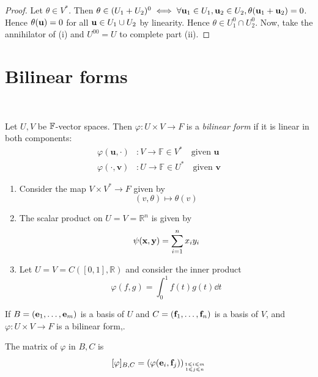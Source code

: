\documentclass[a4paper]{article}
\begin{document}
\begin{proof}
	Let \( \theta \in V^* \).
	Then \( \theta \in (U_1 + U_2)^0 \iff \forall {\bf u}_1 \in U_1, {\bf u}_2 \in U_2, \theta({\bf u}_1 + {\bf u}_2) = 0 \).
	Hence \( \theta({\bf u}) = 0 \) for all \( {\bf u} \in U_1 \cup U_2 \) by linearity.
	Hence \( \theta \in U_1^0 \cap U_2^0 \).
	Now, take the annihilator of (i) and \( U^{00} = U \) to complete part (ii).
\end{proof}

\section{Bilinear forms}\ \vspace{-1.5em}
\begin{definition}
	Let \( U, V \) be \( {\mathbb{F}} \)-vector spaces.
	Then \( \varphi \colon U \times V \to F \) is a \textit{bilinear form} if it is linear in both components:
    \begin{align*}
        \varphi(\mathbf{u},\cdot)&: V \to \mathbb{F} \in V^* \quad \text{given }\mathbf{u}\\
        \varphi(\cdot, \mathbf{v})&: U \to \mathbb{F} \in U^* \quad \text{given }\mathbf{v}
    \end{align*}
\end{definition}

\begin{example}
	\begin{enumerate}
        \item Consider the map \( V \times V^* \to F \) given by
        \[
            (v, \theta) \mapsto \theta(v)
        \]
    
        \item The scalar product on \( U = V = \mathbb R^n \) is given by
        \[
            \psi({\bf x}, {\bf y}) = \sum_{i=1}^n x_i y_i
        \]
    
        \item Let \( U = V = C([0,1], \mathbb R) \) and consider the inner product
        \[
            \varphi(f,g) = \int_0^1 f(t)g(t) \dd{t}
        \]
    \end{enumerate}
\end{example}

\begin{definition}
	If \( B = ({\bf e}_1, \dots, {\bf e}_m) \) is a basis of \( U \) and \( C = ({\bf f}_1, \dots, {\bf f}_n) \) is a basis of \( V \), and \( \varphi \colon U \times V \to F \) is a bilinear form,.
    
    The matrix of $ \varphi $ in $B,C$ is
	\[
		[\varphi]_{B, C} = \qty( \varphi({\bf e}_i, {\bf f}_j) )_{1 \leqslant i \leqslant m\atop 1 \leqslant j \leqslant n}
	\]
\end{definition}
\end{document}
